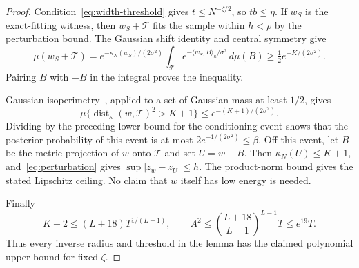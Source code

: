 \begin{proof}
Condition~\eqref{eq:width-threshold} gives $t\le N^{-\zeta/2}$,
so $tb\le\eta$. If $w_S$ is the exact-fitting witness, then
$w_S+\mathcal T$ fits the sample within $h<\rho$ by the perturbation
bound. The Gaussian shift identity and central symmetry give
\[
 \mu(w_S+\mathcal T)
 =e^{-\kappa_N(w_S)/(2\sigma^2)}
   \int_{\mathcal T}e^{-\langle w_S,B\rangle_\kappa/\sigma^2}\,d\mu(B)
 \ge\tfrac12e^{-K/(2\sigma^2)}.
\]
Pairing $B$ with $-B$ in the integral proves the inequality.

Gaussian isoperimetry~\cite{borell,ledoux}, applied to a set of
Gaussian mass at least $1/2$, gives
\[
 \mu\{\operatorname{dist}_\kappa(w,\mathcal T)^2>K+1\}
 \le e^{-(K+1)/(2\sigma^2)}.
\]
Dividing by the preceding lower bound for the conditioning event
shows that the posterior probability of this event is at most
$2e^{-1/(2\sigma^2)}\le\beta$. Off this event, let $B$ be the metric
projection of $w$ onto $\mathcal T$ and set $U=w-B$.
Then $\kappa_N(U)\le K+1$, and~\eqref{eq:perturbation} gives
$\sup|z_w-z_U|\le h$. The product-norm bound gives the stated
Lipschitz ceiling. No claim that $w$ itself has low energy is needed.

Finally
\[
 K+2\le(L+18)T^{1/(L-1)},\qquad
 A^2\le\left(\frac{L+18}{L-1}\right)^{L-1}T\le e^{19}T.
\]
Thus every inverse radius and threshold in the lemma has the claimed
polynomial upper bound for fixed $\zeta$.
\end{proof}
